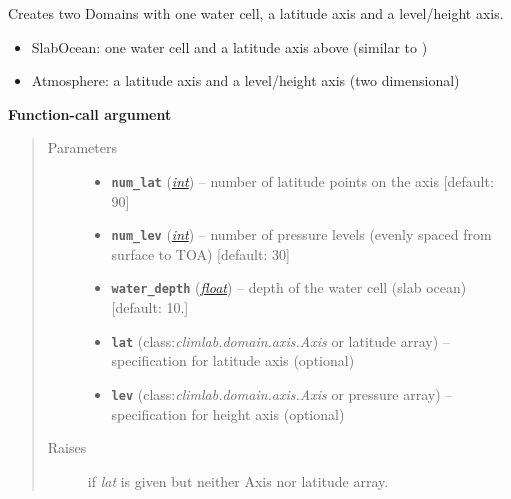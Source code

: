 \documentclass[letterpaper,10pt,english]{sphinxmanual}
\begin{document}
\begin{fulllineitems}
\label{api/climlab.domain:climlab.domain.domain.zonal_mean_column}
Creates two Domains with one water cell, a latitude axis and 
a level/height axis.
\begin{itemize}
\item {} 
SlabOcean:    one water cell and a latitude axis above 
(similar to {\hyperref[api/climlab.domain:climlab.domain.domain.zonal_mean_surface]{\emph{}}})

\item {} 
Atmosphere: a latitude axis and a level/height axis (two dimensional)

\end{itemize}

\textbf{Function-call argument}
\begin{quote}\begin{description}
\item[{Parameters}] \leavevmode\begin{itemize}
\item {} 
\textbf{\texttt{num\_lat}} (\href{http://docs.python.org/2.7/library/functions.html\#int}{\emph{int}}) -- number of latitude points on the axis
{[}default: 90{]}

\item {} 
\textbf{\texttt{num\_lev}} (\href{http://docs.python.org/2.7/library/functions.html\#int}{\emph{int}}) -- number of pressure levels
(evenly spaced from surface to TOA) {[}default: 30{]}

\item {} 
\textbf{\texttt{water\_depth}} (\href{http://docs.python.org/2.7/library/functions.html\#float}{\emph{float}}) -- depth of the water cell (slab ocean) {[}default: 10.{]}

\item {} 
\textbf{\texttt{lat}} (class:\emph{climlab.domain.axis.Axis} or latitude array) -- specification for latitude axis (optional)

\item {} 
\textbf{\texttt{lev}} (class:\emph{climlab.domain.axis.Axis} or pressure array) -- specification for height axis (optional)

\end{itemize}

\item[{Raises}] \leavevmode
{}  if \emph{lat} is given but neither Axis nor latitude array.


\end{description}
\end{quote}
\end{fulllineitems}
\end{document}

